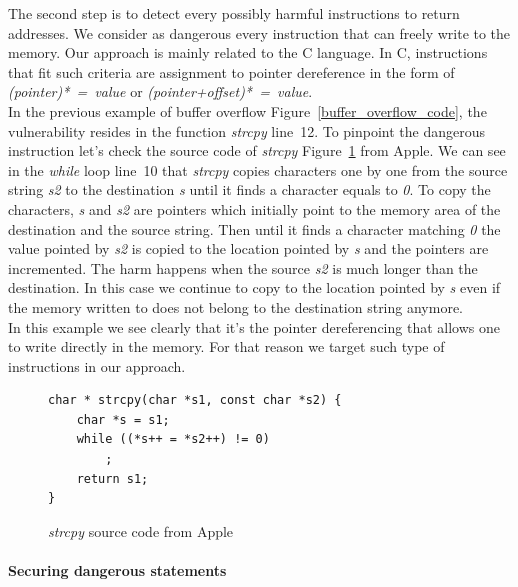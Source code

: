 \documentclass[11pt]{sdm}
\begin{document}
The second step is to detect every possibly harmful instructions to return addresses. We consider as dangerous every instruction that can freely write to the memory. Our approach is mainly related to the C language.
In C, instructions that fit such criteria are assignment to pointer dereference in the form of  \textit{(pointer)*~=~value} or \textit{(pointer+offset)*~=~value}. \\
In the previous example of buffer overflow Figure~\ref{buffer_overflow_code}, the vulnerability resides in the function \textit{strcpy} line~12. To pinpoint the dangerous instruction let's check the source code of \textit{strcpy} Figure~\ref{strcpy} from Apple.
We can see in the \textit{while} loop line~10 that \textit{strcpy} copies characters one by one from the source string \textit{s2} to the destination \textit{s} until it finds a character equals to \textit{0}.
To copy the characters, \textit{s} and \textit{s2} are pointers which initially point to the memory area of the destination and the source string. Then until it finds a character matching \textit{0} the value pointed by \textit{s2} is copied to the location pointed by \textit{s} and the pointers are incremented. The harm happens when the source \textit{s2} is much longer than the destination. In this case we continue to copy to the location pointed by \textit{s} even if the memory written to does not belong to the destination string anymore.\\
In this example we see clearly that it's the pointer dereferencing that allows one to write directly in the memory. For that reason we target such type of instructions in our approach.

\begin{figure}[!ht]
\begin{lstlisting}
char * strcpy(char *s1, const char *s2) {
	char *s = s1;
	while ((*s++ = *s2++) != 0)
		;
	return s1;
}
\end{lstlisting}
\centering
\caption{\textit{strcpy} source code from Apple}
\label{strcpy}
\end{figure}

\paragraph{Securing dangerous statements}
\label{par:Protection around dangerous statements}
\end{document}

